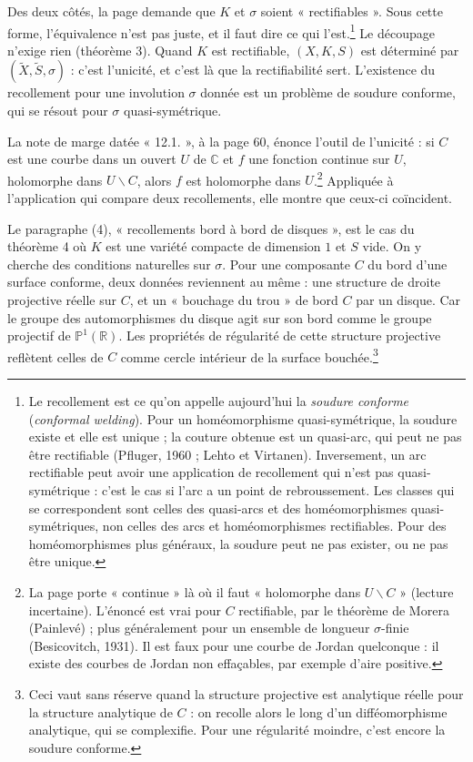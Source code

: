 \documentclass[11pt,a4paper]{article}
\begin{document}
Des deux côtés, la page demande que $K$ et $\sigma$ soient « rectifiables ».
Sous cette forme, l'équivalence n'est pas juste, et il faut dire ce qui
l'est.\footnote{Le recollement est ce qu'on appelle aujourd'hui la
\emph{soudure conforme} (\emph{conformal welding}). Pour un homéomorphisme
quasi-symétrique, la soudure existe et elle est unique ; la couture obtenue
est un quasi-arc, qui peut ne pas être rectifiable (Pfluger, 1960 ; Lehto et
Virtanen). Inversement, un arc rectifiable peut avoir une application de
recollement qui n'est pas quasi-symétrique : c'est le cas si l'arc a un
point de rebroussement. Les classes qui se correspondent sont celles des
quasi-arcs et des homéomorphismes quasi-symétriques, non celles des arcs et
homéomorphismes rectifiables. Pour des homéomorphismes plus généraux, la
soudure peut ne pas exister, ou ne pas être unique.} Le découpage n'exige
rien (théorème 3). Quand $K$ est rectifiable, $(X, K, S)$ est déterminé par
$(\widetilde{X}, \widetilde{S}, \sigma)$ : c'est l'unicité, et c'est là que
la rectifiabilité sert. L'existence du recollement pour une involution
$\sigma$ donnée est un problème de soudure conforme, qui se résout pour
$\sigma$ quasi-symétrique.

La note de marge datée « 12.1. », à la page 60, énonce l'outil de l'unicité :
si $C$ est une courbe dans un ouvert $U$ de $\mathbb{C}$ et $f$ une fonction
continue sur $U$, holomorphe dans $U \smallsetminus C$, alors $f$ est
holomorphe dans $U$.\footnote{La page porte « continue » là où il faut
« holomorphe dans $U \smallsetminus C$ » (lecture incertaine). L'énoncé est
vrai pour $C$ rectifiable, par le théorème de Morera (Painlevé) ; plus
généralement pour un ensemble de longueur $\sigma$-finie (Besicovitch,
1931). Il est faux pour une courbe de Jordan quelconque : il existe des
courbes de Jordan non effaçables, par exemple d'aire positive.} Appliquée à
l'application qui compare deux recollements, elle montre que ceux-ci
coïncident.

Le paragraphe (4), « recollements bord à bord de disques », est le cas du
théorème 4 où $K$ est une variété compacte de dimension $1$ et $S$ vide. On
y cherche des conditions naturelles sur $\sigma$. Pour une composante $C$ du
bord d'une surface conforme, deux données reviennent au même : une structure
de droite projective réelle sur $C$, et un « bouchage du trou » de bord $C$
par un disque. Car le groupe des automorphismes du disque agit sur son bord
comme le groupe projectif de $\mathbb{P}^{1}(\mathbb{R})$. Les propriétés de
régularité de cette structure projective reflètent celles de $C$ comme cercle
intérieur de la surface bouchée.\footnote{Ceci vaut sans réserve quand la
structure projective est analytique réelle pour la structure analytique de
$C$ : on recolle alors le long d'un difféomorphisme analytique, qui se
complexifie. Pour une régularité moindre, c'est encore la soudure conforme.}
\end{document}
